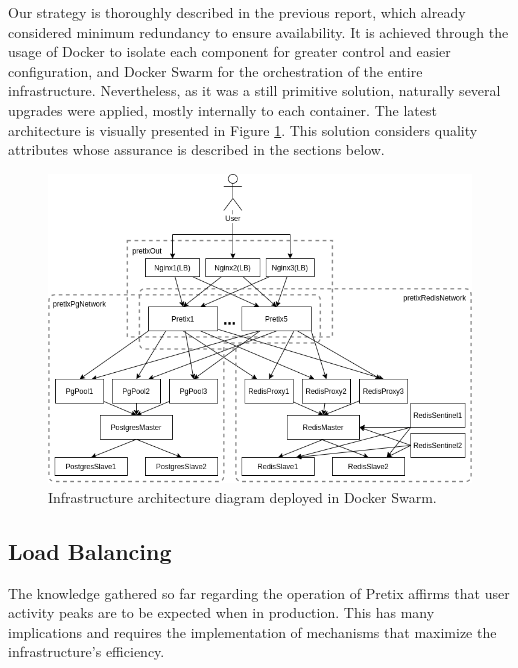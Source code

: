 \documentclass[12pt]{article}
\begin{document}
Our strategy is thoroughly described in the previous report, which already considered minimum redundancy to ensure availability.
It is achieved through the usage of Docker \cite{docker} to isolate each component for greater control and easier configuration, and Docker Swarm \cite{dockerswarm} 
for the orchestration of the entire infrastructure.
Nevertheless, as it was a still primitive solution, naturally several upgrades were applied, mostly internally to each container.
The latest architecture is visually presented in Figure \ref{fig:InfrastructureArchitecture}.
This solution considers quality attributes whose assurance is described in the sections below.

\begin{figure}[H]
  \centering
  \begin{minipage}{.85\textwidth}
    \centering
    \includegraphics[width=\linewidth]{diagrams/InfrastructureArchitecture.png}
  \end{minipage}%
  \caption{Infrastructure architecture diagram deployed in Docker Swarm.}
  \label{fig:InfrastructureArchitecture}
\end{figure}

\subsection{Load Balancing} \label{architecture.loadbalancing} %


The knowledge gathered so far regarding the operation of Pretix affirms that user activity peaks are to be expected when in production.
This has many implications and requires the implementation of mechanisms that maximize the infrastructure's efficiency.
\end{document}
